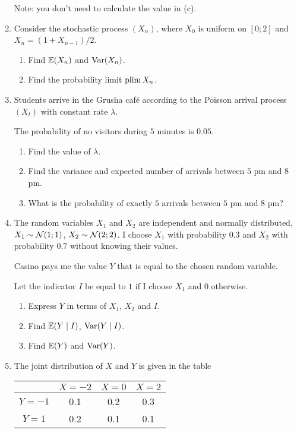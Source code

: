 \begin{enumerate}
  Note: you don't need to calculate the value in (c). 
  
  \item Consider the stochastic process $(X_n)$, where $X_0$ is uniform on $[0;2]$ and
  $X_n = (1 + X_{n-1}) / 2$.

  \begin{enumerate}
    \item Find $\operatorname{\mathbb{E}}(X_n)$ and $\operatorname{Var}(X_n)$.
    \item Find the probability limit $\operatorname*{plim} X_n$.
  \end{enumerate}
  
  \item Students arrive in the Grusha café according to the Poisson arrival process $(X_t)$ 
  with constant rate $\lambda$. 

  The probability of no visitors during $5$ minutes is $0.05$. 
  
  \begin{enumerate}
    \item Find the value of $\lambda$.
    \item Find the variance and expected number of arrivals between $5$ pm and $8$ pm. 
    \item What is the probability of exactly $5$ arrivals between $5$ pm and $8$ pm?
  \end{enumerate}

  \item 
  The random variables $X_1$ and $X_2$ are independent and normally distributed, 
  $X_1 \sim \mathcal{N}(1;1)$, $X_2 \sim \mathcal{N}(2;2)$. 
  I choose $X_1$ with probability $0.3$ and $X_2$ with probability $0.7$ without knowing their values.
  
  Casino pays me the value $Y$ that is equal to the chosen random variable. 

  Let the indicator $I$ be equal to $1$ if I choose $X_1$ and $0$ otherwise. 

  \begin{enumerate}
    \item Express $Y$ in terms of $X_1$, $X_2$ and $I$.
    \item Find $\operatorname{\mathbb{E}}(Y \mid I)$, $\operatorname{Var}(Y \mid I)$.
    \item Find $\operatorname{\mathbb{E}}(Y)$ and $\operatorname{Var}(Y)$. 
  \end{enumerate}

  \item The joint distribution of $X$ and $Y$ is given in the table
    
    \begin{tabular}{*{4}{c}}
    \toprule
    & $X=-2$ & $X=0$ & $X=2$ \\
    \midrule
    $Y=-1$ & 0.1 & 0.2 & 0.3  \\
    $Y=1$ & 0.2 & 0.1 & 0.1  \\
    \bottomrule
    \end{tabular}
    

\end{enumerate}

